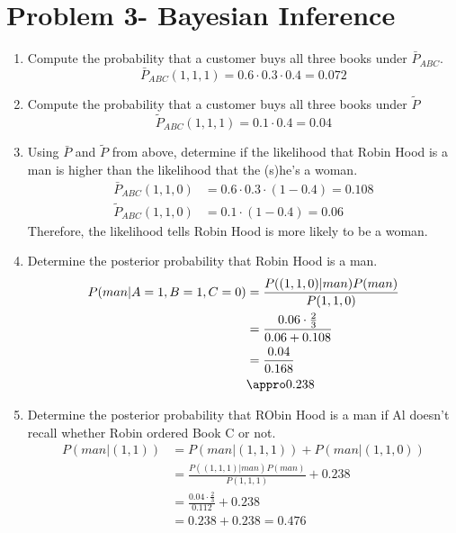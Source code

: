\documentclass[preprint,12pt]{elsarticle}
\begin{document}
	\section{Problem 3- Bayesian Inference}
	\begin{enumerate}[label=\alph*]
		\item Compute the probability that a customer buys all three
		books under $\bar{P}_{ABC}$.
		\begin{equation*}
			\bar{P}_{ABC}(1,1,1) = 0.6\cdot 0.3\cdot 0.4 = 0.072
 		\end{equation*}
		 
		\item Compute the probability that a customer buys all three
		books under $\tilde{P}$
		\begin{equation*}
			\tilde{P}_{ABC}(1,1,1) = 0.1\cdot 0.4 = 0.04
		\end{equation*}
		 
		\item Using $\bar{P}$ and $\tilde{P}$ from above, determine if 
		the likelihood that Robin Hood is a man is higher than the 
		likelihood that the (s)he's a woman.
		\begin{align*}
			\bar{P}_{ABC}(1,1,0) &= 0.6\cdot 0.3\cdot (1-0.4) = 0.108\\
			\tilde{P}_{ABC}(1,1,0) &= 0.1\cdot (1-0.4) = 0.06
		\end{align*}
		Therefore, the likelihood tells Robin Hood is more likely to be 
		a woman.

		\item Determine the posterior probability that Robin Hood is a man.
		\begin{align*}
			P(man|A=1,B=1,C=0) &= \frac{P((1,1,0)|man)P(man)}{P(1,1,0)}\\
			&= \frac{0.06\cdot \frac{2}{3}}{0.06+0.108}\\
			&= \frac{0.04}{0.168}\\
			&\appro 0.238
		\end{align*}

		\item Determine the posterior probability that RObin Hood is a man if 
		Al doesn't recall whether Robin ordered Book C or not.
		\begin{align*}
			P(man|(1,1)) &= P(man|(1,1,1)) + P(man|(1,1,0))\\
			&= \frac{P((1,1,1)|man)P(man)}{P(1,1,1)} + 0.238\\
			&= \frac{0.04\cdot \frac{2}{3}}{0.112} + 0.238\\
			&= 0.238 + 0.238 = 0.476
		\end{align*}


\end{enumerate}
\end{document}
